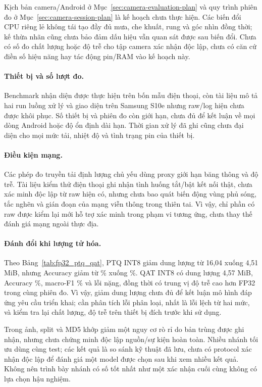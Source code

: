 Kịch bản camera/Android ở Mục~\ref{sec:camera-evaluation-plan} và quy trình phiên đo ở Mục~\ref{sec:camera-session-plan} là kế hoạch chưa thực hiện. Các biến đổi CPU riêng lẻ không tái tạo đầy đủ mưa, che khuất, rung và góc nhìn đồng thời; kế thừa nhãn cũng chưa bảo đảm dấu hiệu vẫn quan sát được sau biến đổi. Chưa có số đo chất lượng hoặc độ trễ cho tập camera xác nhận độc lập, chưa có căn cứ điền số hiệu năng hay tác động pin/RAM vào kế hoạch này.

\paragraph{Thiết bị và số lượt đo.}
Benchmark nhận diện được thực hiện trên bốn mẫu điện thoại, còn tài liệu mô tả hai run luồng xử lý và giao diện trên Samsung S10e nhưng raw/log hiện chưa được khôi phục. Số thiết bị và phiên đo còn giới hạn, chưa đủ để kết luận về mọi dòng Android hoặc độ ổn định dài hạn. Thời gian xử lý đã ghi cũng chưa đại diện cho mọi mức tải, nhiệt độ và tình trạng pin của thiết bị.

\paragraph{Điều kiện mạng.}
Các phép đo truyền tải định lượng chủ yếu dùng proxy giới hạn băng thông và độ trễ. Tài liệu kiểm thử điện thoại ghi nhận tình huống tắt/bật kết nối thật, chưa xác minh độc lập từ raw hiện có, nhưng chưa bao quát biến động vùng phủ sóng, tắc nghẽn và gián đoạn của mạng viễn thông trong thiên tai. Vì vậy, chỉ phần có raw được kiểm lại mới hỗ trợ xác minh trong phạm vi tương ứng, chưa thay thế đánh giá mạng ngoài thực địa.

\paragraph{Đánh đổi khi lượng tử hóa.}
Theo Bảng~\ref{tab:fp32_ptq_qat}, PTQ INT8 giảm dung lượng từ 16,04 xuống 4,51 MiB, nhưng Accuracy giảm từ \NewImageAccuracy\% xuống \PTQAccuracy\%. QAT INT8 có dung lượng 4,57 MiB, Accuracy \QATAccuracy\%, macro-F1 \QATMacroFOne\% và \QATCriticalCount{} lỗi nặng, đồng thời có trung vị độ trễ cao hơn FP32 trong cùng phiên đo. Vì vậy, giảm dung lượng chưa đủ để kết luận mô hình đáp ứng yêu cầu triển khai; cần phân tích lỗi phân loại, nhất là lỗi lệch từ hai mức, và kiểm tra lại chất lượng, độ trễ trên thiết bị đích trước khi sử dụng.

Trong ảnh, split và MD5 khớp giảm một nguy cơ rò rỉ do bản trùng được ghi nhận, nhưng chưa chứng minh độc lập nguồn/sự kiện hoàn toàn. Nhiều nhánh tối ưu dùng cùng test; các kết quả là so sánh kỹ thuật đã lưu, chưa có protocol xác nhận độc lập để đánh giá một model được chọn sau khi xem nhiều kết quả. Không nên trình bày nhánh có số tốt nhất như một xác nhận cuối cùng không có lựa chọn hậu nghiệm.

